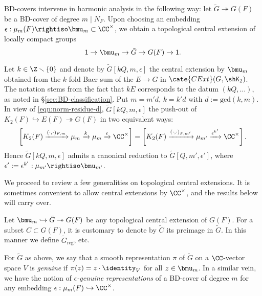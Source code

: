 \documentclass[a4paper,10pt]{article}
\begin{document}
BD-covers intervene in harmonic analysis in the following way: let $\tilde{G} \twoheadrightarrow G(F)$ be a BD-cover of degree $m \mid N_F$. Upon choosing an embedding $\epsilon: \mu_m(F) \rightiso \bmu_m \subset \CC^\times$, we obtain a topological central extension of locally compact groups
\[ 1 \to \bmu_m \to \tilde{G} \to G(F) \to 1. \]

\begin{remark}\label{rem:rescaling-Q}
	Let $k \in \Z \smallsetminus \{0\}$ and denote by $\tilde{G}[kQ, m, \epsilon]$ the central extension by $\bmu_m$ obtained from the $k$-fold Baer sum of the $E \to G$ in $\cate{CExt}(G, \shK_2)$. The notation stems from the fact that $kE$ corresponds to the datum $(kQ, \ldots)$, as noted in \S\ref{sec:BD-classification}. Put $m=m'd$, $k=k'd$ with $d := \text{gcd}(k,m)$. In view of \eqref{eqn:norm-residue-d}, $\tilde{G}[kQ, m, \epsilon]$ the push-out of $K_2(F) \hookrightarrow E(F) \twoheadrightarrow G(F)$ in two equivalent ways:
	\[ \left[ K_2(F) \xrightarrow{(\cdot,\cdot)_{F,m}} \mu_m \xrightarrow{k} \mu_m \xrightarrow{\epsilon} \CC^\times \right] = \left[ K_2(F) \xrightarrow{(\cdot, \cdot)_{F,m'}} \mu_{m'} \xrightarrow{\epsilon^{k'}} \CC^\times \right]. \]
	Hence $\tilde{G}[kQ, m, \epsilon]$ admits a canonical reduction to $\tilde{G}[Q, m', \epsilon']$, where $\epsilon' := \epsilon^{k'}: \mu_{m'} \rightiso \bmu_{m'}$.
\end{remark}

We proceed to review a few generalities on topological central extensions. It is sometimes convenient to allow central extensions by $\CC^\times$, and the results below will carry over.
\begin{notation}
	Let $\bmu_m \hookrightarrow \tilde{G} \twoheadrightarrow G(F)$ be any topological central extension of $G(F)$. For a subset $C \subset G(F)$, it is customary to denote by $\tilde{C}$ its preimage in $\tilde{G}$. In this manner we define $\tilde{G}_{\text{reg}}$, etc.
\end{notation}

\begin{definition}
	For $\tilde{G}$ as above, we say that a smooth representation $\pi$ of $\tilde{G}$ on a $\CC$-vector space $V$ is \emph{genuine} if $\pi(z) = z \cdot \identity_V$ for all $z \in \bmu_m$. In a similar vein, we have the notion of \emph{$\epsilon$-genuine representations} of a BD-cover of degree $m$ for any embedding $\epsilon: \mu_m(F) \hookrightarrow \CC^\times$.
\end{definition}
\end{document}
